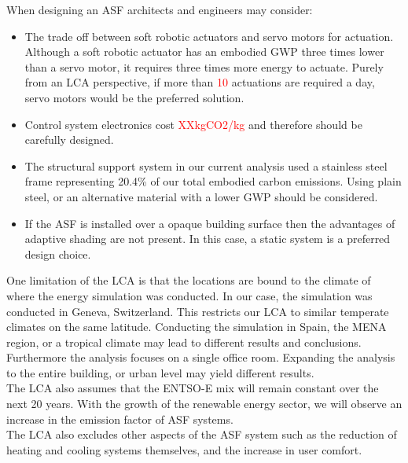 When designing an ASF architects and engineers may consider: 
\begin{itemize}
\item The trade off between soft robotic actuators and servo motors for actuation. Although a soft robotic actuator has an embodied GWP three times lower than a servo motor, it requires three times more energy to actuate. Purely from an LCA perspective, if more than \textcolor{red}{10} actuations are required a day, servo motors would be the preferred solution. 
\item Control system electronics cost \textcolor{red}{XXkgCO2/kg} and therefore should be carefully designed.
\item The structural support system in our current analysis used a stainless steel frame representing 20.4\% of our total embodied carbon emissions. Using plain steel, or an alternative material with a lower GWP should be considered.
\item If the ASF is installed over a opaque building surface then the advantages of adaptive shading are not present. In this case, a static system is a preferred design choice. 
\end{itemize}

One limitation of the LCA is that the locations are bound to the climate of where the energy simulation was conducted. In our case, the simulation was conducted in Geneva, Switzerland. This restricts our LCA to similar temperate climates on the same latitude. Conducting the simulation in Spain, the MENA region, or a tropical climate may lead to different results and conclusions. Furthermore the analysis focuses on a single office room. Expanding the analysis to the entire building, or urban level may yield different results.\\
The LCA also assumes that the ENTSO-E mix will remain constant over the next 20 years. With the growth of the renewable energy sector, we will observe an increase in the emission factor of ASF systems. \\
The LCA also excludes other aspects of the ASF system such as the reduction of heating and cooling systems themselves, and the increase in user comfort. 



